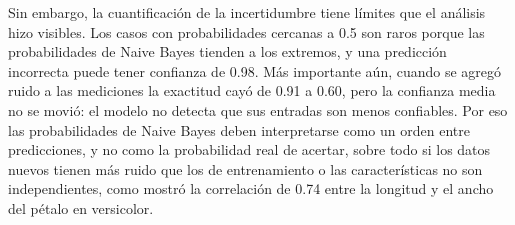 \documentclass[11pt,letterpaper]{article}
\begin{document}
Sin embargo, la cuantificación de la incertidumbre tiene límites que el análisis hizo visibles. Los casos con probabilidades cercanas a 0.5 son raros porque las probabilidades de Naive Bayes tienden a los extremos, y una predicción incorrecta puede tener confianza de 0.98. Más importante aún, cuando se agregó ruido a las mediciones la exactitud cayó de 0.91 a 0.60, pero la confianza media no se movió: el modelo no detecta que sus entradas son menos confiables. Por eso las probabilidades de Naive Bayes deben interpretarse como un orden entre predicciones, y no como la probabilidad real de acertar, sobre todo si los datos nuevos tienen más ruido que los de entrenamiento o las características no son independientes, como mostró la correlación de 0.74 entre la longitud y el ancho del pétalo en versicolor.

\end{document}
